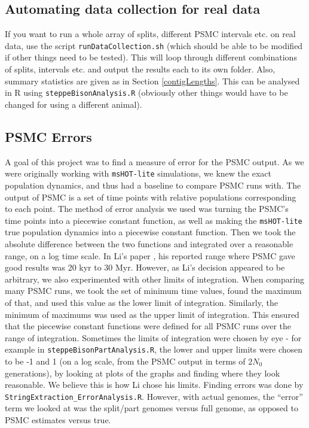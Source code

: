 \documentclass[11pt,a4paper]{article}
\begin{document}
\subsection{Automating data collection for real data}
If you want to run a whole array of splits, different PSMC intervals etc. on real data, use the script \verb|runDataCollection.sh| (which should be able to be modified if other things need to be tested). This will loop through different combinations of splits, intervals etc. and output the results each to its own folder. Also, summary statistics are given as in Section \ref{contigLengths}. This can be analysed in R using \verb|steppeBisonAnalysis.R| (obviously other things would have to be changed for using a different animal).

\subsection{PSMC Errors}
A goal of this project was to find a measure of error for the PSMC output. As we were originally working with \verb|msHOT-lite| simulations, we knew the exact population dynamics, and thus had a baseline to compare PSMC runs with. The output of PSMC is a set of time points with relative populations corresponding to each point. The method of error analysis we used was turning the PSMC's time points into a piecewise constant function, as well as making the \verb|msHOT-lite| true population dynamics into a piecewise constant function. Then we took the absolute difference between the two functions and integrated over a reasonable range, on a log time scale. In Li's paper \cite{li2011inference}, his reported range where PSMC gave good results was 20 kyr to 30 Myr. However, as Li's decision appeared to be arbitrary, we also experimented with other limits of integration. When comparing many PSMC runs, we took the set of minimum time values, found the maximum of that, and used this value as the lower limit of integration. Similarly, the minimum of maximums was used as the upper limit of integration. This ensured that the piecewise constant functions were defined for all PSMC runs over the range of integration. Sometimes the limits of integration were chosen by eye - for example in \verb|steppeBisonPartAnalysis.R|, the lower and upper limits were chosen to be -1 and 1 (on a log scale, from the PSMC output in terms of $2N_0$ generations), by looking at plots of the graphs and finding where they look reasonable. We believe this is how Li chose his limits. Finding errors was done by \verb|StringExtraction_ErrorAnalysis.R|. However, with actual genomes, the ``error'' term we looked at was the split/part genomes versus full genome, as opposed to PSMC estimates versus true.
\end{document}
